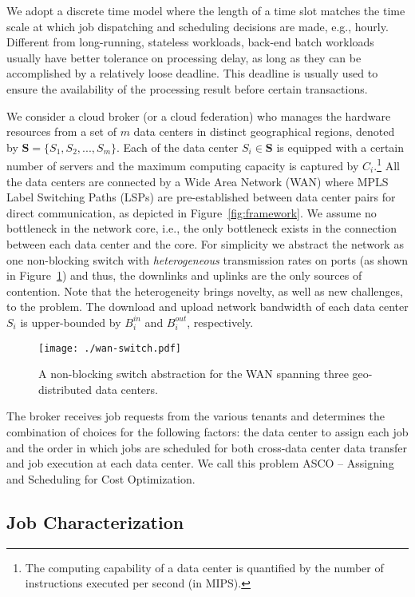 \documentclass{article}
\begin{document}
We adopt a discrete time model where the length of a time slot matches the time scale at which job dispatching and scheduling decisions are made, e.g., hourly. Different from long-running, stateless workloads, back-end batch workloads usually have better tolerance on processing delay, as long as they can be accomplished by a relatively loose deadline. This deadline is usually used to ensure the availability of the processing result before certain transactions.

We consider a cloud broker (or a cloud federation) who manages the hardware resources from a set of $m$ data centers in distinct geographical regions, denoted by $\mathbf{S} = \{S_1, S_2,...,S_m\}$. Each of the data center $S_i \in \mathbf{S}$ is equipped with a certain number of servers and the maximum computing capacity is captured by $C_i$.\footnote{The computing capability of a data center is quantified by the number of instructions executed per second (in MIPS).} All the data centers are connected by a Wide Area Network (WAN) where MPLS Label Switching Paths (LSPs) are pre-established between data center pairs for direct communication, as depicted in Figure~\ref{fig:framework}. We assume no bottleneck in the network core, i.e., the only bottleneck exists in the connection between each data center and the core. For simplicity we abstract the network as one non-blocking switch with \emph{heterogeneous} transmission rates on ports (as shown in Figure~\ref{fig:wan-switch}) and thus, the downlinks and uplinks are the only sources of contention. Note that the heterogeneity brings novelty, as well as new challenges, to the problem. The download and upload network bandwidth of each data center $S_i$ is upper-bounded by $B_i^{in}$ and $B_i^{out}$, respectively.

\begin{figure}
\centering
\texttt{[image: ./wan-switch.pdf]}
\caption{\label{fig:wan-switch} A non-blocking switch abstraction for the WAN spanning three geo-distributed data centers. }
\end{figure}

The broker receives job requests from the various tenants and determines the combination of choices for the following factors: the data center to assign each job and the order in which jobs are scheduled for both cross-data center data transfer and job execution at each data center. We call this problem ASCO -- Assigning and Scheduling for Cost Optimization.

\subsection{Job Characterization}
\end{document}
